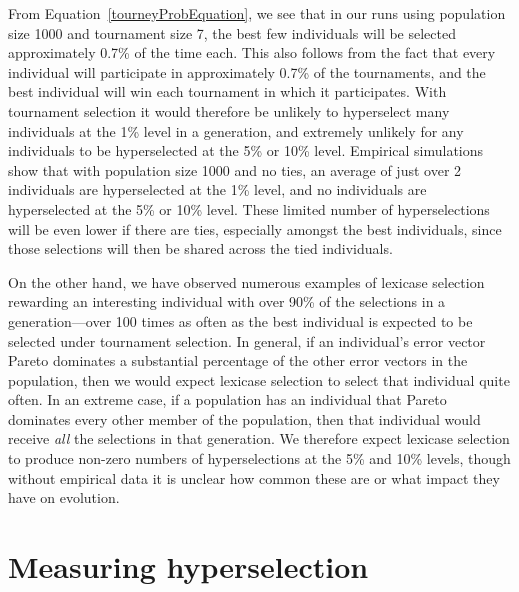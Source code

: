 \documentclass{sig-alternate}
\begin{document}
From Equation~\ref{tourneyProbEquation}, we see that in our runs using population size 1000 and tournament size 7, the best few individuals will be selected approximately 0.7\% of the time each. This also follows from the fact that every individual will participate in approximately 0.7\% of the tournaments, and the best individual will win each tournament in which it participates.
With tournament selection it would therefore be unlikely to hyperselect many individuals at the 1\% level in a generation, and extremely unlikely for any individuals to be hyperselected at the 5\% or 10\% level. Empirical simulations show that with population size 1000 and no ties, an average of just over 2 individuals are hyperselected at the 1\% level, and no individuals are hyperselected at the 5\% or 10\% level. These limited number of hyperselections will be even lower if there are ties, especially amongst the best individuals, since those selections will then be shared across the tied individuals.

On the other hand, we have observed numerous examples of lexicase selection rewarding an interesting individual with over 90\% of the selections in a generation---over 100 times as often as the best individual is expected to be selected under tournament selection. In general, if an individual's error vector Pareto dominates a substantial percentage of the other error vectors in the population, then we would expect lexicase selection to select that individual quite often. In an extreme case, if a population has an individual that Pareto dominates every other member of the population, then that individual would receive \emph{all} the selections in that generation. We therefore expect lexicase selection to produce non-zero numbers of hyperselections at the 5\% and 10\% levels, though without empirical data it is unclear how common these are or what impact they have on evolution.

\section{Measuring hyperselection}
\label{section:experiments}
\end{document}
